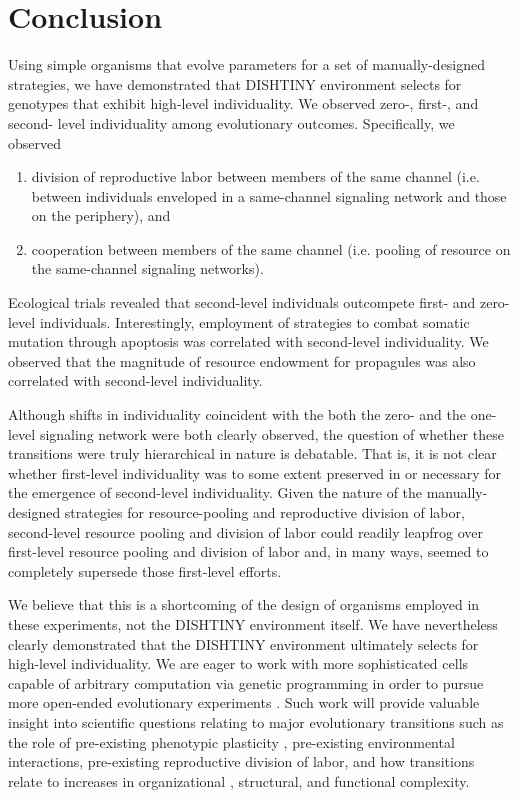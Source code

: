 \section{Conclusion}

Using simple organisms that evolve parameters for a set of manually-designed strategies, we have demonstrated that DISHTINY environment selects for genotypes that exhibit high-level individuality.
We observed zero-, first-, and second- level individuality among evolutionary outcomes.
Specifically, we observed
\begin{enumerate}
  \item division of reproductive labor between members of the same channel (i.e. between individuals enveloped in a same-channel signaling network and those on the periphery), and
  \item cooperation between members of the same channel (i.e. pooling of resource on the same-channel signaling networks).
\end{enumerate}

Ecological trials revealed that second-level individuals outcompete first- and zero-level individuals.
Interestingly, employment of strategies to combat somatic mutation through apoptosis was correlated with second-level individuality.
We observed that the magnitude of resource endowment for propagules was also correlated with second-level individuality.

Although shifts in individuality coincident with the both the zero- and the one-level signaling network were both clearly observed, the question of whether these transitions were truly hierarchical in nature is debatable.
That is, it is not clear whether first-level individuality was to some extent preserved in or necessary for the emergence of second-level individuality.
Given the nature of the manually-designed strategies for resource-pooling and reproductive division of labor, second-level resource pooling and division of labor could readily leapfrog over first-level resource pooling and division of labor and, in many ways, seemed to completely supersede those first-level efforts.

We believe that this is a shortcoming of the design of organisms employed in these experiments, not the DISHTINY environment itself.
We have nevertheless clearly demonstrated that the DISHTINY environment ultimately selects for high-level individuality.
We are eager to work with more sophisticated cells capable of arbitrary computation via genetic programming in order to pursue more open-ended evolutionary experiments \cite{ofria2004avida}.
Such work will provide valuable insight into scientific questions relating to major evolutionary transitions such as the role of pre-existing phenotypic plasticity \citep{clune2007investigating, lalejini2016evolutionary}, pre-existing environmental interactions, pre-existing reproductive division of labor, and how transitions relate to increases in organizational \citep{goldsby2012task}, structural, and functional \citep{goldsby2014evolutionary} complexity.

